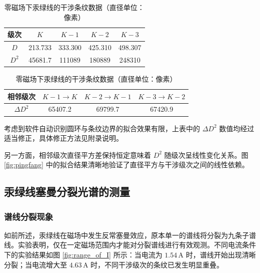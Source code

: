 \documentclass[a4paper, 1.5lines]{ctexart}
\begin{document}
\begin{table}[h!]
    \centering
    \caption{零磁场下汞绿线的干涉条纹数据（直径单位：像素）}
    \label{tab:data}
    \begin{tabular}{|c|c|c|c|c|}
    \hline
    级次 & $K$ & $K-1$ & $K-2$ & $K-3$ \\
    \hline
    $D$ & 213.733 & 333.300 & 425.310 & 498.307 \\
    \hline
    $D^2$ & 45681.7 & 111089 & 180889 & 248310 \\
    \hline
    \end{tabular}
    \hfill
    \begin{tabular}{|c|c|c|c|}
    \hline
    相邻级次 & $K-1\rightarrow K$ & $K-2\rightarrow K-1$ & $K-3\rightarrow K-2$ \\
    \hline
    $\Delta D^2$ & 65407.2 & 69799.7 & 67420.9 \\
    \hline
    \end{tabular}
\end{table}

考虑到软件自动识别圆环与条纹边界的拟合效果有限，上表中的 $\Delta D^2$ 数值均经过适当修正，具体修正方法见附录说明。

另一方面，相邻级次直径平方差保持恒定意味着 $D^2$ 随级次呈线性变化关系。图 \ref{fig:pingfang} 中的拟合结果清晰地验证了直径平方与干涉级次之间的线性依赖。

\subsection{汞绿线塞曼分裂光谱的测量}

\subsubsection{谱线分裂现象}

如前所述，汞绿线在磁场中发生反常塞曼效应，原本单一的谱线将分裂为九条子谱线。实验表明，仅在一定磁场范围内才能对分裂谱线进行有效观测。不同电流条件下的实验结果如图 \ref{fig:range_of_I} 所示：当电流为 $1.54\,\mathrm{A}$ 时，谱线开始出现清晰分裂；当电流增大至 $4.63\,\mathrm{A}$ 时，不同干涉级次的条纹已发生明显重叠。
\end{document}
